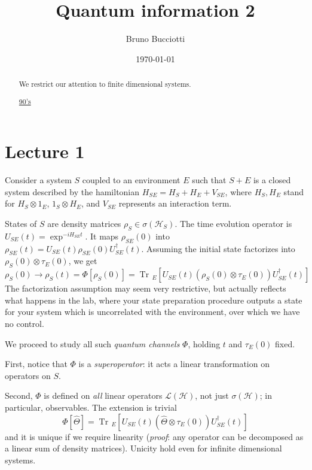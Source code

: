 \documentclass[a4paper, 11pt]{article}
\date{\today}
\author{Bruno Bucciotti}
\title{Quantum information 2}
\newcommand{\Tr}{\mathop{\mathrm{Tr}\!}{}}
\newcommand{\HH}{\mathcal{H}}
\begin{document}
	\maketitle
	
	\begin{abstract}
		We restrict our attention to finite dimensional systems.
		
		\href{https://www.youtube.com/watch?v=GyKcdbFGeV8}{90's}
		
	\end{abstract}

	\tableofcontents
	\clearpage
	\section{Lecture 1}
	Consider a system $S$ coupled to an environment $E$ such that $S+E$ is a closed system described by the hamiltonian $H_{SE} = H_S + H_E + V_{SE}$, where $H_S,H_E$ stand for $H_S\otimes 1_E$, $1_S\otimes H_E$, and $V_{SE}$ represents an interaction term.
	
	States of $S$ are density matrices $\rho_S\in\sigma(\HH_S)$.
	The time evolution operator is $U_{SE}(t) = \exp^{-i H_{SE} t}$. It maps $\rho_{SE}(0)$ into $\rho_{SE}(t) = U_{SE}(t) \rho_{SE}(0) U^\dagger_{SE}(t)$. Assuming the initial state factorizes into $\rho_S(0)\otimes\tau_E(0)$, we get
	\[ \rho_S(0)\rightarrow \rho_S(t) = \Phi\left[\rho_S(0)\right] = \Tr_E\left[ U_{SE}(t) \left(\rho_S(0)\otimes\tau_E(0)\right) U^\dagger_{SE}(t) \right] \]
	The factorization assumption may seem very restrictive, but actually reflects what happens in the lab, where your state preparation procedure outputs a state for your system which is uncorrelated with the environment, over which we have no control.
	\vspace{5mm}
	
	We proceed to study all such \emph{quantum channels} $\Phi$, holding $t$ and $\tau_E(0)$ fixed.
	
	\noindent First, notice that $\Phi$ is a \emph{superoperator}: it acts a linear transformation on operators on $S$.
	
	\noindent Second, $\Phi$ is defined on \emph{all} linear operators $\mathcal{L}(\HH)$, not just $\sigma(\HH)$; in particular, observables. The extension is trivial
	\[ \Phi\left[\hat{\Theta}\right] = \Tr_E\left[ U_{SE}(t) \left(\hat{\Theta}\otimes\tau_E(0)\right) U^\dagger_{SE}(t) \right] \]
	and it is unique if we require linearity (\emph{proof}: any operator can be decomposed as a linear sum of density matrices). Unicity hold even for infinite dimensional systems.
	
\end{document}
